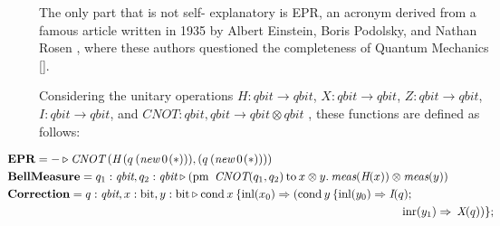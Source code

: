 The only part that is not self- explanatory is EPR, an acronym derived from a famous article written in 1935 by Albert Einstein, Boris Podolsky, and Nathan Rosen , where these authors questioned the completeness of Quantum Mechanics [\cite{einstein1935can}].

Considering the unitary operations $H: \textit{qbit} \xrightarrow{}  \textit{qbit}$, $X: \textit{qbit} \xrightarrow{}  \textit{qbit}$, $Z: \textit{qbit} \xrightarrow{}  \textit{qbit}$, $I: \textit{qbit} \xrightarrow{}  \textit{qbit}$, and $\textit{CNOT}: \textit{qbit}, \textit{qbit} \xrightarrow{}  \textit{qbit} \otimes \textit{qbit}$ , these functions are defined as follows:

\begin{align*}
  \hspace{-28pt} &\textbf{EPR} =  - \triangleright  \textit{CNOT} \hspace{2pt} (\textit{H}\hspace{2pt} (q  \hspace{2pt}    ( \textit{new}   \hspace{2pt}  0 \hspace{1pt}(*))),(q  \hspace{2pt}   ( \textit{new}   \hspace{2pt}  0 \hspace{1pt}(*))))  \\ 
      \hspace{-28pt}
      &\textbf{BellMeasure} =  q_{1}: \textit{qbit}, q_{2}: \textit{qbit}  \triangleright  (\text{pm}  \hspace{5pt} \textit{CNOT} (q_{1},q_{2})  \hspace{2pt}  \text{to} \hspace{2pt} x \otimes y.  \hspace{2pt}  \textit{meas} (\textit{H} (x)) \otimes \textit{meas} (y) ) \\
      \hspace{-28pt}
      &\textbf{Correction}= q: \textit{qbit}, x: \text{bit},  y: \text{bit} \triangleright  \text{cond}\hspace{2pt} x  \hspace{2pt}  \{\text{inl} (x_{0}) \Rightarrow  (\text{cond}\hspace{2pt} y  \hspace{2pt}  \{\text{inl} (y_{0})  \Rightarrow{}  \textit{I}(q); \\
      \hspace{-28pt}
      & \hspace{335pt} \hspace{5pt} \text{inr} (y_{1}) \Rightarrow  \hspace{2pt}   \textit{X} (q))\} ; \\

\end{align*}
